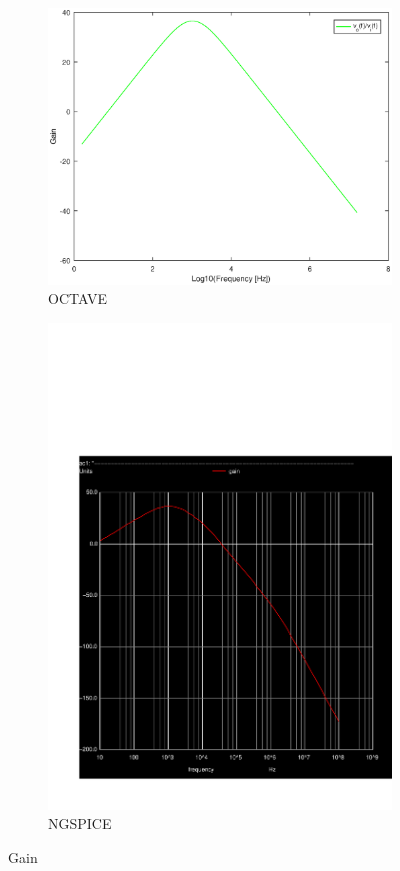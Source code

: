 \begin{figure}[H] 
\centering
\begin{subfigure}{0.4\textwidth}
\includegraphics[width=\textwidth]{gain.eps}
\caption{OCTAVE}
\label{Octave_gain}
\end{subfigure}
\begin{subfigure}{0.3\textwidth}
\includegraphics[width=\textwidth]{Gain.pdf}
\caption{NGSPICE}
\label{Ngspice_gain}
\end{subfigure}
\caption{Gain}
\end{figure}

